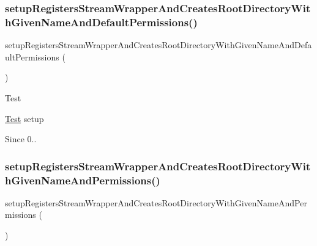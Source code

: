 \subsubsection{\texorpdfstring{setup\+Registers\+Stream\+Wrapper\+And\+Creates\+Root\+Directory\+With\+Given\+Name\+And\+Default\+Permissions()}{setupRegistersStreamWrapperAndCreatesRootDirectoryWithGivenNameAndDefaultPermissions()}}
{\footnotesize\ttfamily setup\+Registers\+Stream\+Wrapper\+And\+Creates\+Root\+Directory\+With\+Given\+Name\+And\+Default\+Permissions (\begin{DoxyParamCaption}{ }\end{DoxyParamCaption})}

\begin{DoxyRefDesc}{Test}
\item[\mbox{\hyperlink{test__test000090}{Test}}]setup \end{DoxyRefDesc}
\begin{DoxySince}{Since}
0.. 
\end{DoxySince}
\mbox{\label{classorg_1_1bovigo_1_1vfs_1_1vfs_stream_test_case_ad61917c375fae467a3d3fdb16edbeace}} 
\subsubsection{\texorpdfstring{setup\+Registers\+Stream\+Wrapper\+And\+Creates\+Root\+Directory\+With\+Given\+Name\+And\+Permissions()}{setupRegistersStreamWrapperAndCreatesRootDirectoryWithGivenNameAndPermissions()}}
{\footnotesize\ttfamily setup\+Registers\+Stream\+Wrapper\+And\+Creates\+Root\+Directory\+With\+Given\+Name\+And\+Permissions (\begin{DoxyParamCaption}{ }\end{DoxyParamCaption})}

